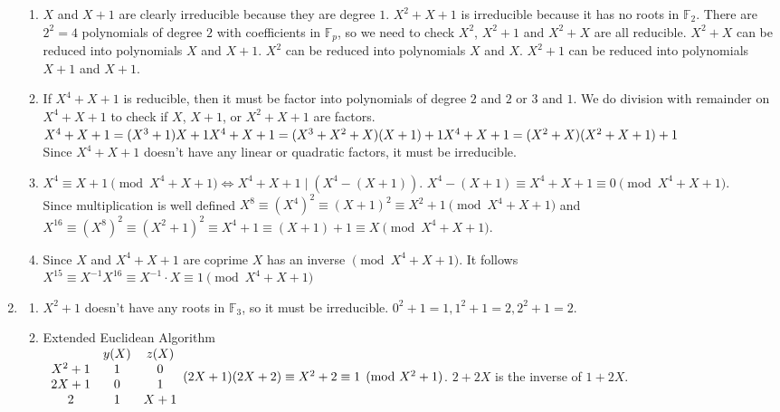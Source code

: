 \documentclass[10pt]{article}
\begin{document}
\begin{enumerate}[label= \arabic*.]
\begin{enumerate}
    \item $X$ and $X+1$ are clearly irreducible because they are degree $1$. $X^2+X+1$ is irreducible because it has no roots in $\mathbb{F}_2$. 
    There are $2^2=4$ polynomials of degree $2$ with coefficients in $\mathbb{F}_p$, 
    so we need to check $X^2$, $X^2+1$ and $X^2+X$ are all reducible. 
    $X^2+X$ can be reduced into polynomials $X$ and $X+1$.
    $X^2$ can be reduced into polynomials $X$ and $X$.
    $X^2+1$ can be reduced into polynomials $X+1$ and $X+1$.
    \item If $X^4+X+1$ is reducible, then it must be factor into polynomials of degree $2$ and $2$ or $3$ and $1$.
    We do division with remainder on $X^4+X+1$ to check if $X$, $X+1$, or $X^2+X+1$ are factors.\\
    $X^4+X+1=(X^3+1)X+1\\
    X^4+X+1=(X^3+X^2+X)(X+1)+1\\
    X^4+X+1=(X^2+X)(X^2+X+1)+1$\\
    Since $X^4+X+1$ doesn't have any linear or quadratic factors, it must be irreducible.
    \item $X^4\equiv X+1\pmod{X^4+X+1}\Leftrightarrow X^4+X+1\mid (X^4-(X+1))$. $X^4-(X+1)\equiv X^4+X+1\equiv0\pmod{X^4+X+1}$.\\ 
    Since multiplication is well defined $X^8\equiv{(X^4)}^2\equiv{(X+1)}^2\equiv X^2+1\pmod{X^4+X+1}$ and $X^{16}\equiv{(X^8)}^2\equiv {(X^2+1)}^2\equiv X^4+1\equiv (X+1)+1\equiv X\pmod{X^4+X+1}$.\\
    \item Since $X$ and $X^4+X+1$ are coprime $X$ has an inverse $\pmod{X^4+X+1}$. It follows $X^{15}\equiv X^{-1}X^{16}\equiv X^{-1}\cdot X\equiv 1\pmod{X^4+X+1}$
\end{enumerate}
\item \begin{enumerate}
    \item $X^2+1$ doesn't have any roots in $\mathbb{F}_3$, so it must be irreducible. $0^2+1=1,1^2+1=2,2^2+1=2$. 
    \item Extended Euclidean Algorithm\\ 
    $\begin{array}{c c c}
        & y(X) & z(X)\\
        X^2+1 & 1 & 0\\
        2X+1 & 0 & 1\\
          2 & 1 & X+1
    \end{array}\\
    (2X+1)(2X+2)\equiv X^2+2\equiv 1\pmod{X^2+1}$.
    $2+2X$ is the inverse of $1+2X$.
\end{enumerate}
\end{enumerate}
\end{document}
